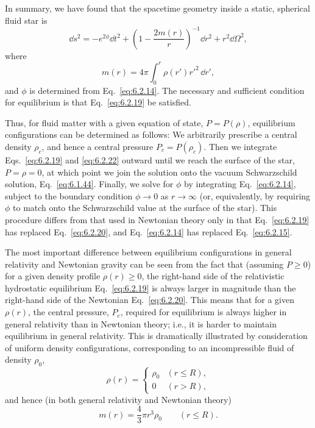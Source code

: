 In summary, we have found that the spacetime geometry inside a static, spherical
fluid star is
\begin{equation}
  \dd s^2=-e^{2\phi}\dd t^2+
  \left(1-\frac{2m(r)}{r}\right)^{-1}\dd r^2+r^2\dd\Omega^2,
  \tag{6.2.21}\label{eq:6.2.21}
\end{equation}
where
\begin{equation}
  m(r)=4\pi\int_0^r\rho(r')r'^2\,\dd r',
  \tag{6.2.22}\label{eq:6.2.22}
\end{equation}
and \(\phi\) is determined from Eq.~\eqref{eq:6.2.14}. The necessary and
sufficient condition for equilibrium is that Eq.~\eqref{eq:6.2.19} be
satisfied.

Thus, for fluid matter with a given equation of state, \(P=P(\rho)\), equilibrium
configurations can be determined as follows: We arbitrarily prescribe a central
density \(\rho_c\), and hence a central pressure \(P_c=P(\rho_c)\). Then we
integrate Eqs.~\eqref{eq:6.2.19} and \eqref{eq:6.2.22} outward until we reach the
surface of the star, \(P=\rho=0\), at which point we join the solution onto the
vacuum Schwarzschild solution, Eq.~\eqref{eq:6.1.44}. Finally, we solve for
\(\phi\) by integrating Eq.~\eqref{eq:6.2.14}, subject to the boundary condition
\(\phi\to0\) as \(r\to\infty\) (or, equivalently, by requiring \(\phi\) to match
onto the Schwarzschild value at the surface of the star). This procedure differs
from that used in Newtonian theory only in that Eq.~\eqref{eq:6.2.19} has replaced
Eq.~\eqref{eq:6.2.20}, and Eq.~\eqref{eq:6.2.14} has replaced
Eq.~\eqref{eq:6.2.15}.

The most important difference between equilibrium configurations in general
relativity and Newtonian gravity can be seen from the fact that (assuming
\(P\geq0\)) for a given density profile \(\rho(r)\geq0\), the right-hand side of
the relativistic hydrostatic equilibrium Eq.~\eqref{eq:6.2.19} is always larger
in magnitude than the right-hand side of the Newtonian Eq.~\eqref{eq:6.2.20}.
This means that for a given \(\rho(r)\), the central pressure, \(P_c\), required
for equilibrium is always higher in general relativity than in Newtonian theory;
i.e., it is harder to maintain equilibrium in general relativity. This is
dramatically illustrated by consideration of uniform density configurations,
corresponding to an incompressible fluid of density \(\rho_0\),
\begin{equation}
  \rho(r)=
  \begin{cases}
    \rho_0 & (r\leq R),\\
    0 & (r>R),
  \end{cases}
  \tag{6.2.23}\label{eq:6.2.23}
\end{equation}
and hence (in both general relativity and Newtonian theory)
\begin{equation}
  m(r)=\frac43\pi r^3\rho_0\qquad(r\leq R).
  \tag{6.2.24}\label{eq:6.2.24}
\end{equation}

